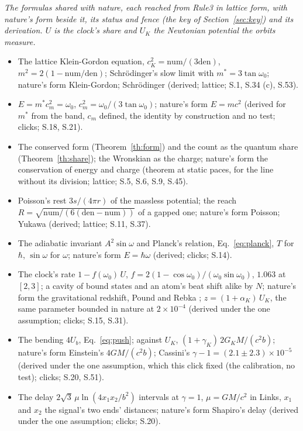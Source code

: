 \documentclass[pdflatex,sn-mathphys-num]{sn-jnl}
\newcommand{\num}{\mathrm{num}}
\newcommand{\den}{\mathrm{den}}
\theoremstyle{thmstyleone}
\theoremstyle{thmstyletwo}
\begin{document}
\noindent\emph{The formulas shared with nature, each reached from Rule3 in lattice form, with nature's form beside it, its status and fence (the key of Section~\ref{sec:key}) and its derivation. $U$ is the clock's share and $U_K$ the Newtonian potential the orbits measure.}
\begin{itemize}[nosep,leftmargin=1.2em]
\item The lattice Klein-Gordon equation, $c_K^2 = \num / (3\den)$, $m^2 = 2(1 - \num / \den)$; Schr\"odinger's slow limit with $m^* = 3\tan\omega_0$; nature's form Klein-Gordon; Schr\"odinger (derived; lattice; S.1, S.34 (c), S.53).
\item $E = m^* c_m^2 = \omega_0$, $c_m^2 = \omega_0 / (3\tan\omega_0)$; nature's form $E = mc^2$ (derived for $m^*$ from the band, $c_m$ defined, the identity by construction and no test; clicks; S.18, S.21).
\item The conserved form (Theorem~\ref{th:form}) and the count as the quantum share (Theorem~\ref{th:share}); the Wronskian as the charge; nature's form the conservation of energy and charge (theorem at static paces, for the line without its division; lattice; S.5, S.6, S.9, S.45).
\item Poisson's rest $3s / (4\pi r)$ of the massless potential; the reach $R = \sqrt{\num / (6(\den - \num))}$ of a gapped one; nature's form Poisson; Yukawa (derived; lattice; S.11, S.37).
\item The adiabatic invariant $A^2\sin\omega$ and Planck's relation, Eq.~\eqref{eq:planck}, $T$ for $\hbar$, $\sin\omega$ for $\omega$; nature's form $E = \hbar\omega$ (derived; clicks; S.14).
\item The clock's rate $1 - f(\omega_0)\,U$, $f = 2(1 - \cos\omega_0) / (\omega_0\sin\omega_0)$, $1.063$ at $[2, 3]$; a cavity of bound states and an atom's beat shift alike by $N$; nature's form the gravitational redshift, Pound and Rebka \cite{pound}; $z = (1 + \alpha_K)\,U_K$, the same parameter bounded in nature at $2 \times 10^{-4}$ \cite{will} (derived under the one assumption; clicks; S.15, S.31).
\item The bending $4U_b$, Eq.~\eqref{eq:push}; against $U_K$, $(1 + \gamma_K)\,2G_K M / (c^2 b)$; nature's form Einstein's $4GM / (c^2 b)$; Cassini's $\gamma - 1 = (2.1 \pm 2.3) \times 10^{-5}$ \cite{bertotti} (derived under the one assumption, which this click fixed (the calibration, no test); clicks; S.20, S.51).
\item The delay $2\sqrt 3\,\mu\ln(4x_1x_2 / b^2)$ intervals at $\gamma = 1$, $\mu = GM / c^2$ in Links, $x_1$ and $x_2$ the signal's two ends' distances; nature's form Shapiro's delay \cite{shapiro} (derived under the one assumption; clicks; S.20).

\end{itemize}
\end{document}
